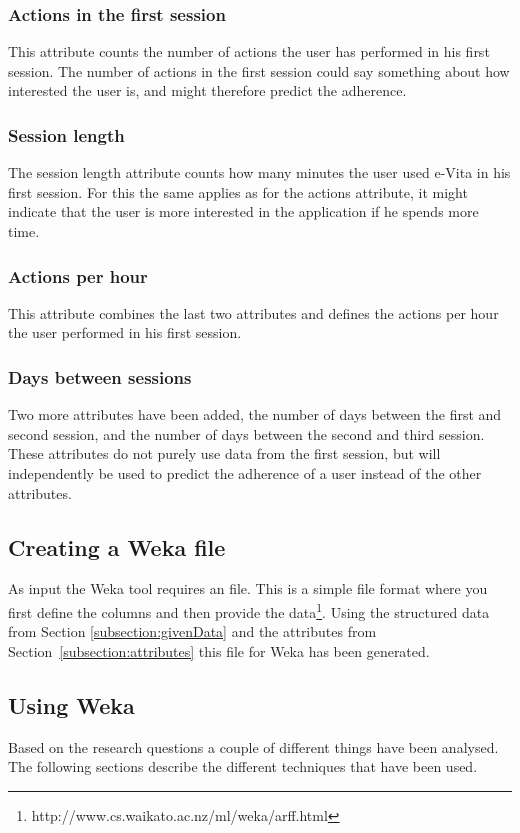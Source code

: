 \subsubsection{Actions in the first session}
This attribute counts the number of actions the user has performed in his first session. The number of actions in the first session could say something about how interested the user is, and might therefore predict the adherence.

\subsubsection{Session length}
The session length attribute counts how many minutes the user used e-Vita in his first session. For this the same applies as for the actions attribute, it might indicate that the user is more interested in the application if he spends more time.

\subsubsection{Actions per hour}
This attribute combines the last two attributes and defines the actions per hour the user performed in his first session.

\subsubsection{Days between sessions}
Two more attributes have been added, the number of days between the first and second session, and the number of days between the second and third session. These attributes do not purely use data from the first session, but will independently be used to predict the adherence of a user instead of the other attributes.

\subsection{Creating a Weka file}
As input the Weka tool requires an  file. This is a simple file format where you first define the columns and then provide the data\footnote{http://www.cs.waikato.ac.nz/ml/weka/arff.html}. Using the structured data from Section \ref{subsection:givenData} and the attributes from Section~\ref{subsection:attributes} this file for Weka has been generated.

\subsection{Using Weka}
Based on the research questions a couple of different things have been analysed. The following sections describe the different techniques that have been used.

